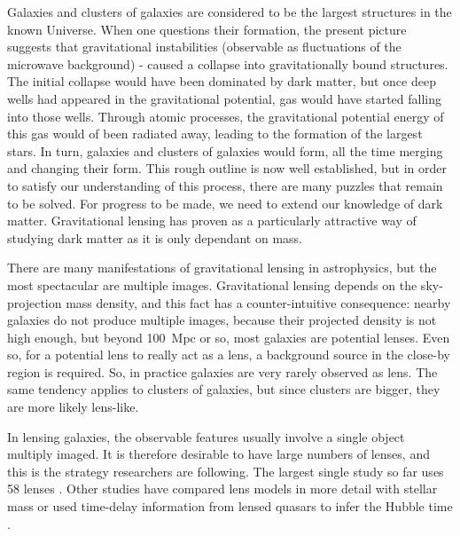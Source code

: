 \documentclass[12pt,preprint]{aastex}
\begin{document}
Galaxies and clusters of galaxies are considered to be the largest structures in the known Universe. When one questions their formation,  the present picture suggests that gravitational instabilities  (observable as fluctuations of the microwave background) %
 - caused a collapse into gravitationally bound structures. %
The initial collapse would have been dominated by dark matter, but once deep wells had appeared in the gravitational potential, gas would have started falling into those wells. 
Through atomic processes,
 the gravitational potential energy of this gas would of been radiated away, leading to the formation of the largest stars. 
In turn, galaxies and clusters of galaxies would form, all the time merging and changing their form.
This rough outline is now well established, but in order to satisfy our understanding of this process, there are many puzzles  that remain to be solved. For progress to be made, we need to extend our knowledge of dark matter. Gravitational lensing has proven as a particularly attractive way of studying dark matter as it is only dependant on mass.


There are many manifestations of gravitational lensing in astrophysics,
but the most spectacular are multiple images.  Gravitational lensing
depends on the sky-projection mass density, and this fact has a
counter-intuitive consequence: nearby galaxies do not produce multiple
images, because their projected density is not high enough, but beyond
100~Mpc or so, most galaxies are potential lenses.  Even so, for a
potential lens to really act as a lens, a background source in the close-by
region is required.  So, in practice galaxies are very rarely observed
as lens.  The same tendency applies to clusters of galaxies, but since
clusters are bigger, they are more likely lens-like.

In lensing galaxies, the observable features usually involve a single
object multiply imaged.  It is therefore desirable to have large
numbers of lenses, and this is the strategy researchers are following.  The
largest single study so far uses 58 lenses \citep{2009ApJ...703L..51K}.
Other studies have compared lens models in more detail with stellar
mass \citep{2011ApJ...740...97L} or used time-delay information from
lensed quasars to infer the Hubble time
\citep{2008ApJ...679...17C,2010ApJ...712.1378P}.
\end{document}
